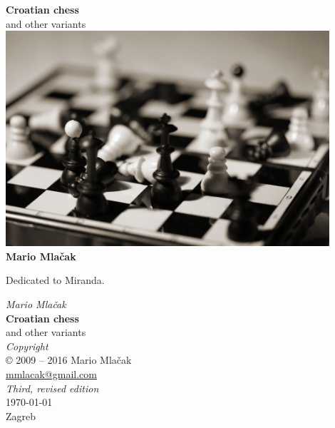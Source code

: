 \documentclass[b5paper,12pt,draft]{book}
\begin{document}
\begin{titlepage}
\begin{center}
    \textbf{\huge{Croatian chess}} \\
    \large{and other variants} \\ [2.0cm]

    \includegraphics[width=0.9\textwidth, keepaspectratio=true]{../gfx/crochess.jpg} \\ [2.0cm]

    \textbf{\large{Mario Mlačak}} \\ [2.0cm]
\end{center}
\end{titlepage}

\thispagestyle{empty}
\vspace*{0.1\textheight}
\clearpage

\thispagestyle{empty}
\vspace*{0.2\textheight}
\hfill{Dedicated to Miranda.}
\clearpage

\thispagestyle{empty}
\vspace*{0.1\textheight}
\begin{center}
    \emph{Mario Mlačak} \\
    \textbf{Croatian chess} \\
    and other variants \\ [2.0em]

    \emph{Copyright} \\
    \copyright \hspace{0.2ex} 2009 -- 2016 Mario Mlačak \\
    \href{mailto:mmlacak@gmail.com}{mmlacak@gmail.com} \\ [2.0em]

    \emph{Third, revised edition} \\
    \today \\
    Zagreb

    \vfill

    \LaTeXe
    \vspace{0.1\textheight}
\end{center}
\clearpage
\end{document}
